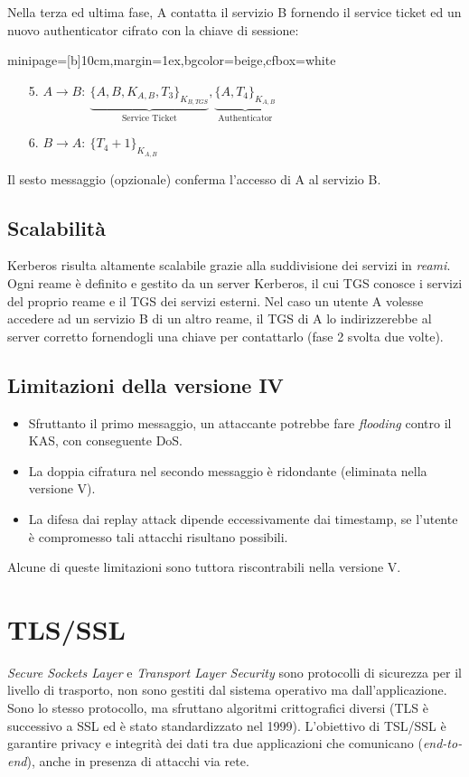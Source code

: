 \documentclass[a4paper, 11pt, notitlepage, fleqn]{report}
\newcommand{\fromto}[2]{#1\rightarrow #2\!:\ }
\newenvironment{colbox}[2]%
{%
	\par\noindent\hspace{10pt}
	\begin{adjustbox}{minipage=[b]{#2},margin=1ex,bgcolor=#1,cfbox=white}
}{%
	\end{adjustbox}\newline%
}
\begin{document}
Nella terza ed ultima fase, A contatta il servizio B fornendo il service ticket ed un nuovo authenticator cifrato con la chiave di sessione:
\begin{colbox}{beige}{10cm}
	\begin{enumerate}
		\item[5.] $\fromto{A}{B}\underbrace{\{A,B,K_{A,B},T_3\}_{K_{B,T\!G\!S}}}_{\mbox{Service Ticket}}, \underbrace{\{A,T_4\}_{K_{A,B}}}_{\mbox{Authenticator}}$
		\item[6.] $\fromto{B}{A}\{T_4+1\}_{K_{A,B}}$
	\end{enumerate}
\end{colbox}
Il sesto messaggio (opzionale) conferma l'accesso di A al servizio B.

\subsection{Scalabilità}
Kerberos risulta altamente scalabile grazie alla suddivisione dei servizi in \emph{reami}. Ogni reame è definito e gestito da un server Kerberos, il cui TGS conosce i servizi del proprio reame e il TGS dei servizi esterni. Nel caso un utente A volesse accedere ad un servizio B di un altro reame, il TGS di A lo indirizzerebbe al server corretto fornendogli una chiave per contattarlo (fase 2 svolta due volte).

\subsection{Limitazioni della versione IV}
\begin{itemize}
	\item Sfruttanto il primo messaggio, un attaccante potrebbe fare \emph{flooding} contro il KAS, con conseguente DoS.
	\item La doppia cifratura nel secondo messaggio è ridondante (eliminata nella versione V).
	\item La difesa dai replay attack dipende eccessivamente dai timestamp, se l'utente è compromesso tali attacchi risultano possibili.
\end{itemize}
Alcune di queste limitazioni sono tuttora riscontrabili nella versione V.


\section{TLS/SSL}
\emph{Secure Sockets Layer} e \emph{Transport Layer Security} sono protocolli di sicurezza per il livello di trasporto, non sono gestiti dal sistema operativo ma dall'applicazione. Sono lo stesso protocollo, ma sfruttano algoritmi crittografici diversi (TLS è successivo a SSL ed è stato standardizzato nel 1999).
L'obiettivo di TSL/SSL è garantire privacy e integrità dei dati tra due applicazioni che comunicano (\emph{end-to-end}), anche in presenza di attacchi via rete.
\end{document}
